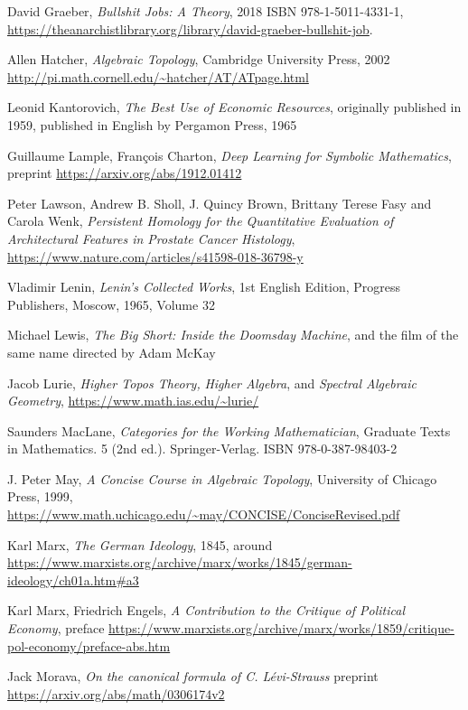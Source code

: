 \documentclass{article}
\begin{document}
\begin{thebibliography}{99}
 David Graeber, \textit{Bullshit Jobs: A Theory}, 2018 ISBN 978-1-5011-4331-1, \url{https://theanarchistlibrary.org/library/david-graeber-bullshit-job}.

 Allen Hatcher, \textit{Algebraic Topology}, Cambridge University Press, 2002 \url{http://pi.math.cornell.edu/~hatcher/AT/ATpage.html}

 Leonid Kantorovich, \textit{The Best Use of Economic Resources}, originally published in 1959,
published in English by Pergamon Press, 1965

 Guillaume Lample, Fran\c cois Charton, \textit{Deep Learning for Symbolic Mathematics}, preprint \url{https://arxiv.org/abs/1912.01412}

 Peter Lawson, Andrew B. Sholl, J. Quincy Brown, Brittany Terese Fasy and Carola Wenk, \textit{Persistent Homology for the Quantitative Evaluation of Architectural Features in Prostate Cancer Histology}, \url{https://www.nature.com/articles/s41598-018-36798-y}

 Vladimir Lenin, \textit{Lenin’s Collected Works}, 1st English Edition, Progress Publishers, Moscow, 1965, Volume 32

 Michael Lewis, \textit{The Big Short: Inside the Doomsday Machine}, and the film of the same name directed by Adam McKay

 Jacob Lurie, \textit{Higher Topos Theory,} \textit{Higher Algebra}, and \textit{Spectral Algebraic Geometry}, \url{https://www.math.ias.edu/~lurie/}


 Saunders MacLane, \textit{Categories for the Working Mathematician}, Graduate Texts in Mathematics. 5 (2nd ed.). Springer-Verlag. ISBN 978-0-387-98403-2

 J. Peter May, \textit{A Concise Course in Algebraic Topology}, University of Chicago Press, 1999, \url{https://www.math.uchicago.edu/~may/CONCISE/ConciseRevised.pdf}

 Karl Marx, \textit{The German Ideology}, 1845, around \url{https://www.marxists.org/archive/marx/works/1845/german-ideology/ch01a.htm#a3}

 Karl Marx, Friedrich Engels, \textit{A Contribution to the Critique of Political Economy}, preface \url{https://www.marxists.org/archive/marx/works/1859/critique-pol-economy/preface-abs.htm}

 Jack Morava, \textit{On the canonical formula of C. L\'evi-Strauss} preprint \url{https://arxiv.org/abs/math/0306174v2}


\end{thebibliography}
\end{document}
